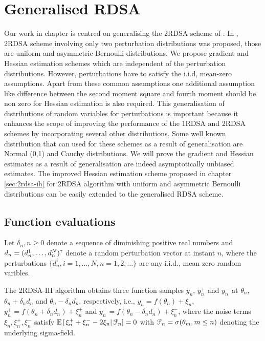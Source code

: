 \chapter{Generalised RDSA }
\label{sec:2rdsa-gen}
Our work in chapter  is centred on generalising the 2RDSA scheme of \cite{prashanth2015rdsa}. In \cite{prashanth2015rdsa}, 2RDSA scheme involving only two perturbation distributions was proposed, those are uniform and asymmetric Bernoulli distributions. We propose gradient and Hessian estimation schemes which are independent of the perturbation distributions. However, perturbations have to satisfy the i.i.d, mean-zero assumptions. Apart from these common assumptions  one additional assumption like difference between the second moment square  and fourth moment should be non zero for Hessian estimation is also required. This generalisation of distributions of random variables for perturbations is important because it enhances the scope of improving the performance of the 1RDSA and 2RDSA schemes by incorporating several other distributions. Some well known distribution that can used for these schemes as a result of generalisation are Normal (0,1) and Cauchy distributions. We will prove the  gradient and Hessian estimates as a result of generalisation are indeed asymptotically unbiased estimates.
 The improved Hessian estimation scheme proposed in chapter \ref{sec:2rdsa-ih} for 2RDSA algorithm with uniform and asymmetric Bernoulli distributions can be easily extended to the generalised RDSA scheme.

\section{Function evaluations}
Let $\delta_n, n\geq 0$ denote a sequence of diminishing positive real numbers and $d_n = (d_n^1,\ldots,d_n^N)^\mathsf{\scriptscriptstyle T}$ denote a random perturbation vector at instant $n$,
where the perturbations $\{d_n^i, i=1,\ldots,N, n=1,2,\ldots\}$ are any i.i.d., mean zero random varibles. 

The 2RDSA-IH algorithm obtains three function samples $y_n$, $y_n^+$ and $y_n^-$ at $\theta_n$, $\theta_n+\delta_n d_n$ and $\theta_n - \delta_n d_n$, respectively, i.e.,
$y_n = f(\theta_n) + \xi_n$, $y_n^+ = f(\theta_n+\delta_n d_n) + \xi_n^+$ and 
$y_n^- = f(\theta_n-\delta_n d_n) + \xi_n^-$,
where the noise terms $\xi_n, \xi_n^+, \xi_n^-$ satisfy $\mathbb{E}\left[\left.\xi_n^+ + \xi_n^- - 2\xi_n \right| \mathcal{F}_n\right] = 0$ with $\mathcal{F}_n = \sigma(\theta_m,m\le n)$ denoting the underlying sigma-field. 

